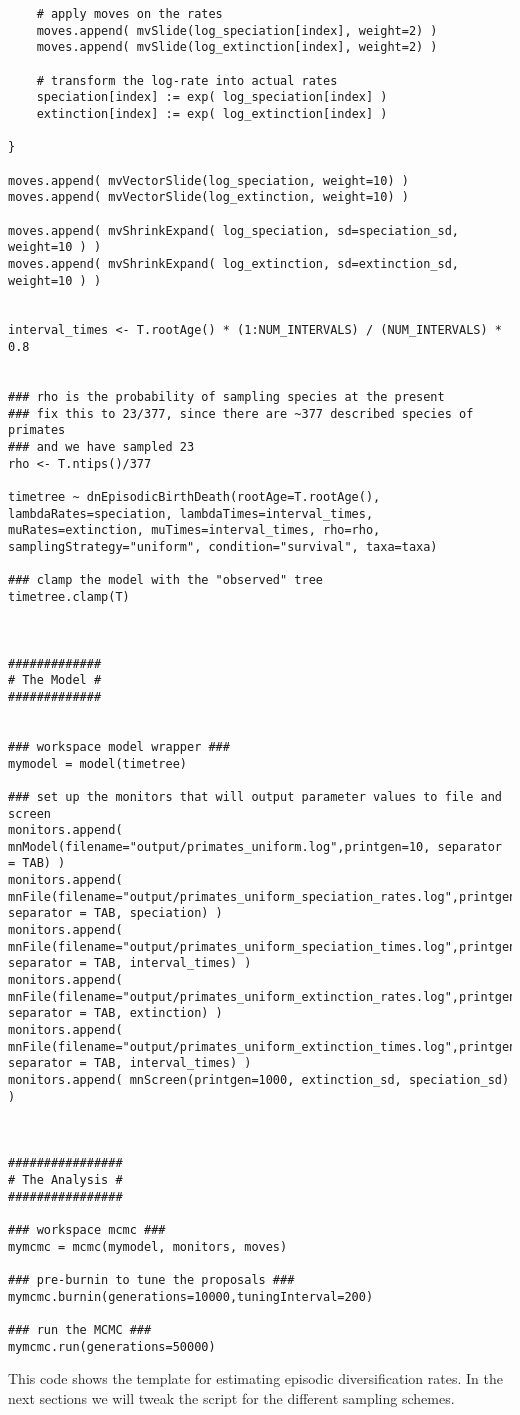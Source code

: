 {\begin{snugshade*}
\begin{lstlisting}
    # apply moves on the rates
    moves.append( mvSlide(log_speciation[index], weight=2) )
    moves.append( mvSlide(log_extinction[index], weight=2) )

    # transform the log-rate into actual rates
    speciation[index] := exp( log_speciation[index] )
    extinction[index] := exp( log_extinction[index] )

}

moves.append( mvVectorSlide(log_speciation, weight=10) )
moves.append( mvVectorSlide(log_extinction, weight=10) )

moves.append( mvShrinkExpand( log_speciation, sd=speciation_sd, weight=10 ) )
moves.append( mvShrinkExpand( log_extinction, sd=extinction_sd, weight=10 ) )


interval_times <- T.rootAge() * (1:NUM_INTERVALS) / (NUM_INTERVALS) * 0.8


### rho is the probability of sampling species at the present
### fix this to 23/377, since there are ~377 described species of primates
### and we have sampled 23
rho <- T.ntips()/377

timetree ~ dnEpisodicBirthDeath(rootAge=T.rootAge(), lambdaRates=speciation, lambdaTimes=interval_times, muRates=extinction, muTimes=interval_times, rho=rho, samplingStrategy="uniform", condition="survival", taxa=taxa)

### clamp the model with the "observed" tree
timetree.clamp(T)



#############
# The Model #
#############


### workspace model wrapper ###
mymodel = model(timetree)

### set up the monitors that will output parameter values to file and screen 
monitors.append( mnModel(filename="output/primates_uniform.log",printgen=10, separator = TAB) )
monitors.append( mnFile(filename="output/primates_uniform_speciation_rates.log",printgen=10, separator = TAB, speciation) )
monitors.append( mnFile(filename="output/primates_uniform_speciation_times.log",printgen=10, separator = TAB, interval_times) )
monitors.append( mnFile(filename="output/primates_uniform_extinction_rates.log",printgen=10, separator = TAB, extinction) )
monitors.append( mnFile(filename="output/primates_uniform_extinction_times.log",printgen=10, separator = TAB, interval_times) )
monitors.append( mnScreen(printgen=1000, extinction_sd, speciation_sd) )



################
# The Analysis #
################

### workspace mcmc ###
mymcmc = mcmc(mymodel, monitors, moves)

### pre-burnin to tune the proposals ###
mymcmc.burnin(generations=10000,tuningInterval=200)

### run the MCMC ###
mymcmc.run(generations=50000)
\end{lstlisting}
\end{snugshade*}}
This \Rev code shows the template for estimating episodic diversification rates.
In the next sections we will tweak the script for the different sampling schemes.




